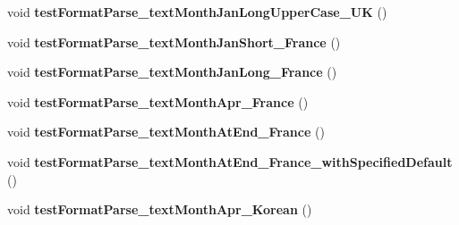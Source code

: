 \begin{DoxyCompactItemize}
\item 
\hypertarget{classorg_1_1joda_1_1time_1_1format_1_1_test_date_time_format_a6ade7421bd6dc7276a54d1c9ff7a7726}{void {\bfseries test\-Format\-Parse\-\_\-text\-Month\-Jan\-Long\-Upper\-Case\-\_\-\-U\-K} ()}\label{classorg_1_1joda_1_1time_1_1format_1_1_test_date_time_format_a6ade7421bd6dc7276a54d1c9ff7a7726}

\item 
\hypertarget{classorg_1_1joda_1_1time_1_1format_1_1_test_date_time_format_a105dfb7cc69bfd4ad0ec2c1d14f5ff44}{void {\bfseries test\-Format\-Parse\-\_\-text\-Month\-Jan\-Short\-\_\-\-France} ()}\label{classorg_1_1joda_1_1time_1_1format_1_1_test_date_time_format_a105dfb7cc69bfd4ad0ec2c1d14f5ff44}

\item 
\hypertarget{classorg_1_1joda_1_1time_1_1format_1_1_test_date_time_format_a8d0df853dcdfbd6e52ab4ac0c8710208}{void {\bfseries test\-Format\-Parse\-\_\-text\-Month\-Jan\-Long\-\_\-\-France} ()}\label{classorg_1_1joda_1_1time_1_1format_1_1_test_date_time_format_a8d0df853dcdfbd6e52ab4ac0c8710208}

\item 
\hypertarget{classorg_1_1joda_1_1time_1_1format_1_1_test_date_time_format_a52008438f583892dadc93bc2c7192ed0}{void {\bfseries test\-Format\-Parse\-\_\-text\-Month\-Apr\-\_\-\-France} ()}\label{classorg_1_1joda_1_1time_1_1format_1_1_test_date_time_format_a52008438f583892dadc93bc2c7192ed0}

\item 
\hypertarget{classorg_1_1joda_1_1time_1_1format_1_1_test_date_time_format_a592168ffffd72d753d0c9c1af1ffb0c5}{void {\bfseries test\-Format\-Parse\-\_\-text\-Month\-At\-End\-\_\-\-France} ()}\label{classorg_1_1joda_1_1time_1_1format_1_1_test_date_time_format_a592168ffffd72d753d0c9c1af1ffb0c5}

\item 
\hypertarget{classorg_1_1joda_1_1time_1_1format_1_1_test_date_time_format_a2ac67f5ce4a9c403007e566d9d730b81}{void {\bfseries test\-Format\-Parse\-\_\-text\-Month\-At\-End\-\_\-\-France\-\_\-with\-Specified\-Default} ()}\label{classorg_1_1joda_1_1time_1_1format_1_1_test_date_time_format_a2ac67f5ce4a9c403007e566d9d730b81}

\item 
\hypertarget{classorg_1_1joda_1_1time_1_1format_1_1_test_date_time_format_a510c30d94acf2afff09d6e5bfb008ec5}{void {\bfseries test\-Format\-Parse\-\_\-text\-Month\-Apr\-\_\-\-Korean} ()}\label{classorg_1_1joda_1_1time_1_1format_1_1_test_date_time_format_a510c30d94acf2afff09d6e5bfb008ec5}


\end{DoxyCompactItemize}
